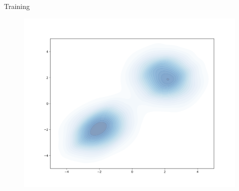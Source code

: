 \documentclass[handout, aspectratio=169,xcolor=dvipsnames]{beamer}
\begin{document}
\begin{frame}{Training}
  \begin{figure}
    \includegraphics[height=0.8\textheight]{figs/gen/gaussian_mixture_training_data}
  \end{figure}
\end{frame}
\end{document}
